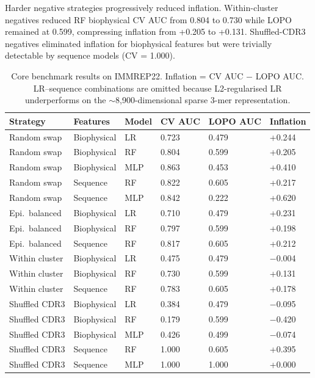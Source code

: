 \documentclass[11pt, a4paper]{article}
\begin{document}
Harder negative strategies progressively reduced inflation. Within-cluster negatives reduced RF biophysical CV AUC from 0.804 to 0.730 while LOPO remained at 0.599, compressing inflation from +0.205 to +0.131. Shuffled-CDR3 negatives eliminated inflation for biophysical features but were trivially detectable by sequence models (CV = 1.000).

\begin{table}[H]
\centering
\caption{Core benchmark results on IMMREP22. Inflation = CV AUC $-$ LOPO AUC. LR--sequence combinations are omitted because L2-regularised LR underperforms on the $\sim$8,900-dimensional sparse 3-mer representation.}
\label{tab:core}
\small
\begin{tabular}{llllll}
\toprule
\textbf{Strategy} & \textbf{Features} & \textbf{Model} & \textbf{CV AUC} & \textbf{LOPO AUC} & \textbf{Inflation} \\
\midrule
Random swap      & Biophysical & LR  & 0.723 & 0.479 & +0.244 \\
Random swap      & Biophysical & RF  & 0.804 & 0.599 & +0.205 \\
Random swap      & Biophysical & MLP & 0.863 & 0.453 & +0.410 \\
Random swap      & Sequence    & RF  & 0.822 & 0.605 & +0.217 \\
Random swap      & Sequence    & MLP & 0.842 & 0.222 & +0.620 \\
\midrule
Epi.\ balanced   & Biophysical & LR  & 0.710 & 0.479 & +0.231 \\
Epi.\ balanced   & Biophysical & RF  & 0.797 & 0.599 & +0.198 \\
Epi.\ balanced   & Sequence    & RF  & 0.817 & 0.605 & +0.212 \\
\midrule
Within cluster   & Biophysical & LR  & 0.475 & 0.479 & $-$0.004 \\
Within cluster   & Biophysical & RF  & 0.730 & 0.599 & +0.131 \\
Within cluster   & Sequence    & RF  & 0.783 & 0.605 & +0.178 \\
\midrule
Shuffled CDR3    & Biophysical & LR  & 0.384 & 0.479 & $-$0.095 \\
Shuffled CDR3    & Biophysical & RF  & 0.179 & 0.599 & $-$0.420 \\
Shuffled CDR3    & Biophysical & MLP & 0.426 & 0.499 & $-$0.074 \\
Shuffled CDR3    & Sequence    & RF  & 1.000 & 0.605 & +0.395 \\
Shuffled CDR3    & Sequence    & MLP & 1.000 & 1.000 & +0.000 \\
\bottomrule
\end{tabular}
\end{table}
\end{document}
